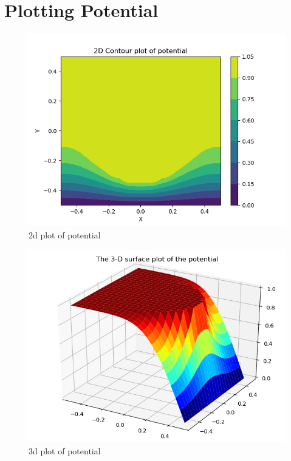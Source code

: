 \documentclass[11pt, a4paper]{article}
\begin{document}
\section{Plotting Potential}
\begin{figure}[!tbh]
   	\centering
   	\includegraphics[scale=0.5]{fig6.png}  %
   	\caption{2d plot of potential}
   	\label{fig:sample}
   \end{figure} 
\begin{figure}[!tbh]
   	\centering
   	\includegraphics[scale=0.5]{fig7.png}  %
   	\caption{3d plot of potential}
   	\label{fig:sample}
   \end{figure}
   
\end{document}
